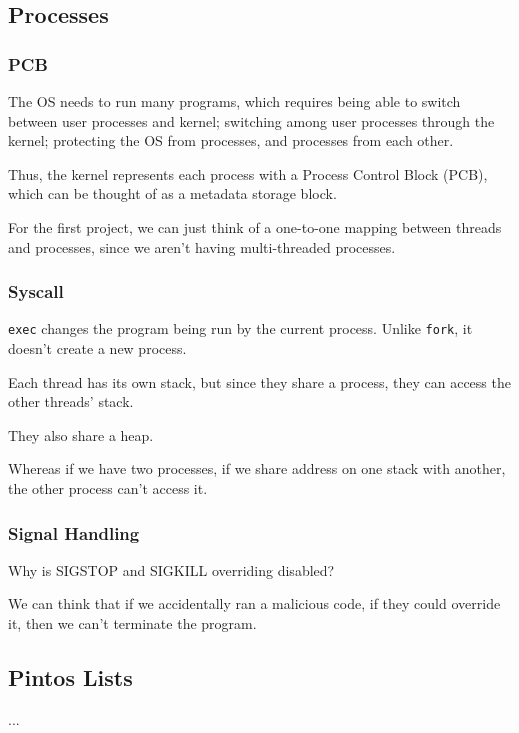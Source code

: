 \documentclass[openany]{book}
\begin{document}
\subsection{Processes}
\subsubsection{PCB}
The OS needs to run many programs, which requires being able to switch between user processes and kernel; switching among user processes through the kernel; protecting the OS from processes, and processes from each other.

Thus, the kernel represents each process with a Process Control Block (PCB), which can be thought of as a metadata storage block.

\begin{rmk}
	For the first project, we can just think of a one-to-one mapping between threads and processes, since we aren't having multi-threaded processes.
\end{rmk}

\subsubsection{Syscall}
\texttt{exec} changes the program being run by the current process. Unlike \texttt{fork}, it doesn't create a new process.

\begin{rmk}
	Each thread has its own stack, but since they share a process, they can access the other threads' stack.
	
	They also share a heap.
	
	Whereas if we have two processes, if we share address on one stack with another, the other process can't access it.
\end{rmk}

\subsubsection{Signal Handling}
\begin{hw}
	Why is SIGSTOP and SIGKILL overriding disabled?
\end{hw}
\begin{solution}
	We can think that if we accidentally ran a malicious code, if they could override it, then we can't terminate the program.
\end{solution}

\subsection{Pintos Lists}
...
\end{document}
